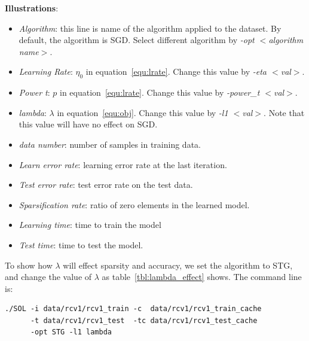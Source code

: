 \documentclass[11pt,a4paper]{article}
\newlength{\wideitemsep}
\let\olditem\item
\renewcommand{\item}{\setlength{\itemsep}{\wideitemsep}\olditem}
\begin{document}
\textbf{Illustrations}:
\begin{itemize}
    \item \emph{Algorithm}: this line is name of the algorithm applied to the dataset.
        By default, the algorithm is SGD. Select different algorithm by
        \emph{-opt $<$algorithm name$>$}. 
    \item \emph{Learning Rate}: $\eta_0$ in equation~\eqref{equ:lrate}. Change
        this value by \emph{-eta $<$val$>$}.
    \item \emph{Power t}: $p$ in equation~\eqref{equ:lrate}. Change this value
        by \emph{-power\_t $<$val$>$}.
    \item \emph{lambda}: $\lambda$ in equation~\eqref{equ:obj}. Change this
        value by \emph{-l1 $<$val$>$}. Note that this value will have no effect on
        SGD.
    \item \emph{data number}: number of samples in training data.
    \item \emph{Learn error rate}: learning error rate at the last iteration.
    \item \emph{Test error rate}: test error rate on the test data.
    \item \emph{Sparsification rate}: ratio of zero elements in the learned
        model.
    \item \emph{Learning time}: time to train the model
    \item \emph{Test time}: time to test the model.
\end{itemize}

To show how $\lambda$ will effect sparsity and accuracy, we set the algorithm
to STG, and change the value of $\lambda$ as table~\ref{tbl:lambda_effect} shows.
The command line is:
\lstset{language=bash,}
\begin{lstlisting}
./SOL -i data/rcv1/rcv1_train -c  data/rcv1/rcv1_train_cache 
      -t data/rcv1/rcv1_test  -tc data/rcv1/rcv1_test_cache 
      -opt STG -l1 lambda
\end{lstlisting}
\end{document}
